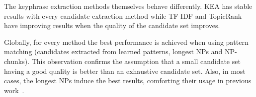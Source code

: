       
      The keyphrase extraction methods themselves behave differently. KEA has
      stable results with every candidate extraction method while TF-IDF and
      TopicRank have improving results when the quality of the candidate set
      improves.

      Globally, for every method the best performance is achieved when using
      pattern matching (candidates extracted from learned patterns, longest NPs
      and NP-chunks). This observation confirms the assumption that a small
      candidate set having a good quality is better than an exhaustive
      candidate set. Also, in most cases, the longest NPs induce the best
      results, comforting their usage in previous
      work~\cite{wan2008expandrank,hassan2010conundrums,bougouin2013topicrank}.

